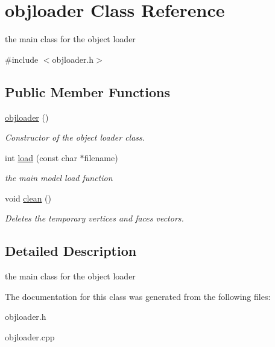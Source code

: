 \hypertarget{classobjloader}{\section{objloader Class Reference}
\label{classobjloader}
}


the main class for the object loader  




{\ttfamily \#include $<$objloader.\-h$>$}

\subsection*{Public Member Functions}
\begin{DoxyCompactItemize}
\item 
\hypertarget{classobjloader_aa402df6b15d5c11d58b4e6cb0a4d54b2}{\hyperlink{classobjloader_aa402df6b15d5c11d58b4e6cb0a4d54b2}{objloader} ()}\label{classobjloader_aa402df6b15d5c11d58b4e6cb0a4d54b2}

\begin{DoxyCompactList}\small\item\em Constructor of the object loader class. \end{DoxyCompactList}\item 
\hypertarget{classobjloader_aab23e4e70b7a23e453a829116d9c84c0}{int \hyperlink{classobjloader_aab23e4e70b7a23e453a829116d9c84c0}{load} (const char $\ast$filename)}\label{classobjloader_aab23e4e70b7a23e453a829116d9c84c0}

\begin{DoxyCompactList}\small\item\em the main model load function \end{DoxyCompactList}\item 
\hypertarget{classobjloader_a050a52ab0724a00d45501bfec8f60b42}{void \hyperlink{classobjloader_a050a52ab0724a00d45501bfec8f60b42}{clean} ()}\label{classobjloader_a050a52ab0724a00d45501bfec8f60b42}

\begin{DoxyCompactList}\small\item\em Deletes the temporary vertices and faces vectors. \end{DoxyCompactList}\end{DoxyCompactItemize}


\subsection{Detailed Description}
the main class for the object loader 

The documentation for this class was generated from the following files\-:\begin{DoxyCompactItemize}
\item 
objloader.\-h\item 
objloader.\-cpp\end{DoxyCompactItemize}
